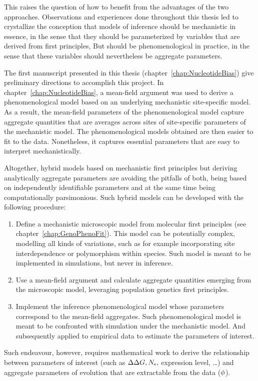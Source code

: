 This raises the question of how to benefit from the advantages of the two approaches.
Observations and experiences done throughout this thesis led to crystallize the conception that models of inference should be mechanistic in essence, in the sense that they should be parameterized by variables that are derived from first principles,
But should be phenomenological in practice, in the sense that these variables should nevertheless be aggregate parameters.

The first manuscript presented in this thesis (chapter~\ref{chap:NucleotideBias}) give preliminary directions to accomplish this project.
In chapter~\ref{chap:NucleotideBias}, a mean-field argument was used to derive a phenomenological model based on an underlying mechanistic site-specific model.
As a result, the mean-field parameters of the phenomenological model capture aggregate quantities that are averages across sites of site-specific parameters of the mechanistic model.
The phenomenological models obtained are then easier to fit to the data.
Nonetheless, it captures essential parameters that are easy to interpret mechanistically.

Altogether, hybrid models based on mechanistic first principles but deriving analytically aggregate parameters are avoiding the pitfalls of both, being based on independently identifiable parameters and at the same time being computationally parsimonious.
Such hybrid models can be developed with the following procedure:
\begin{enumerate}
    \item Define a mechanistic microscopic model from molecular first principles (see chapter~\ref{chap:GenoPhenoFit}).
        This model can be potentially complex, modelling all kinds of variations, such as for example incorporating site interdependence or polymorphism within species.
        Such model is meant to be implemented in simulations, but never in inference.
    \item Use a mean-field argument and calculate aggregate quantities emerging from the microscopic model, leveraging population genetics first principles.
    \item Implement the inference phenomenological model whose parameters correspond to the mean-field aggregates.
        Such phenomenological model is meant to be confronted with simulation under the mechanistic model.
        And subsequently applied to empirical data to estimate the parameters of interest.
\end{enumerate}
Such endeavour, however, requires mathematical work to derive the relationship between parameters of interest (such as $\Delta \Delta G, N_{\textrm{e}}, $ expression level, \ldots) and aggregate parameters of evolution that are extractable from the data ($\phi$).

